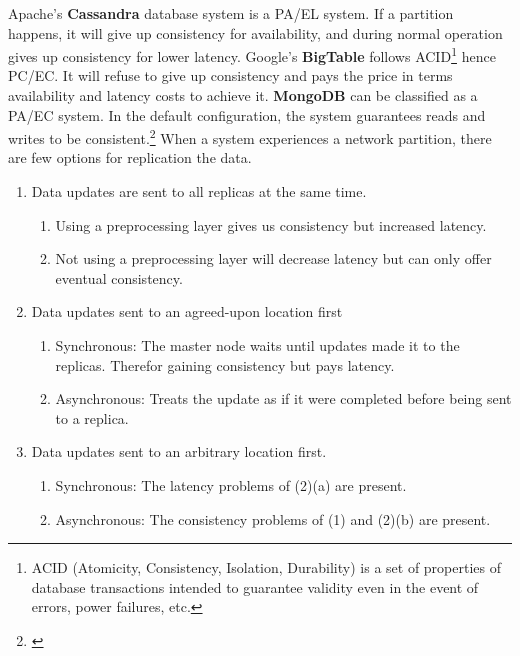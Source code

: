 \noindent Apache's \textbf{Cassandra} database system is a PA/EL system. If a partition happens, it will give up consistency for availability, and during normal operation gives up consistency for lower latency. Google's \textbf{BigTable} follows ACID\footnote{ACID (Atomicity, Consistency, Isolation, Durability) is a set of properties of database transactions intended to guarantee validity even in the event of errors, power failures, etc.} hence PC/EC. It will refuse to give up consistency and pays the price in terms availability and latency costs to achieve it. \textbf{MongoDB} can be classified as a PA/EC system. In the default configuration, the system guarantees reads and writes to be consistent.\footnote{\cite[p.~42]{Abadi2012}} When a system experiences a network partition, there are few options for replication the data.
\begin{enumerate}
	
	\item Data updates are sent to all replicas at the same time.
	\begin{enumerate}
		\item Using a preprocessing layer gives us consistency but increased latency.
		\item Not using a preprocessing layer will decrease latency but can only offer eventual consistency.
	\end{enumerate}
	\item Data updates sent to an agreed-upon location first
	\begin{enumerate}
		\item Synchronous: The master node waits until updates made it to the replicas. Therefor gaining consistency but pays latency.
		\item Asynchronous: Treats the update as if it were completed before being sent to a replica.
	\end{enumerate}
	\item Data updates sent to an arbitrary location first.
		\begin{enumerate}
		\item Synchronous: The latency problems of (2)(a) are present.
		\item Asynchronous: The consistency problems of (1) and (2)(b) are present.
	\end{enumerate}
\end{enumerate}